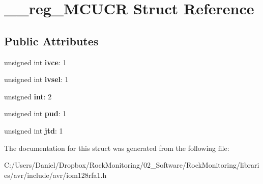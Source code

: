 \hypertarget{struct____reg___m_c_u_c_r}{}\section{\+\_\+\+\_\+reg\+\_\+\+M\+C\+U\+CR Struct Reference}
\label{struct____reg___m_c_u_c_r}
\subsection*{Public Attributes}
\begin{DoxyCompactItemize}
\item 
unsigned int {\bfseries ivce}\+: 1\hypertarget{struct____reg___m_c_u_c_r_a3bcdedf7d673406a14f68a2a5ac43a3f}{}\label{struct____reg___m_c_u_c_r_a3bcdedf7d673406a14f68a2a5ac43a3f}

\item 
unsigned int {\bfseries ivsel}\+: 1\hypertarget{struct____reg___m_c_u_c_r_ab6ba72c07957acc703f0e887277ac563}{}\label{struct____reg___m_c_u_c_r_ab6ba72c07957acc703f0e887277ac563}

\item 
unsigned {\bfseries int}\+: 2\hypertarget{struct____reg___m_c_u_c_r_ae5c3ca2b668922d54541b2b3dafc0f65}{}\label{struct____reg___m_c_u_c_r_ae5c3ca2b668922d54541b2b3dafc0f65}

\item 
unsigned int {\bfseries pud}\+: 1\hypertarget{struct____reg___m_c_u_c_r_a44f01c4a9c724c48301011e10e2c3314}{}\label{struct____reg___m_c_u_c_r_a44f01c4a9c724c48301011e10e2c3314}

\item 
unsigned int {\bfseries jtd}\+: 1\hypertarget{struct____reg___m_c_u_c_r_a96265fd906c29283314a808a9d03589d}{}\label{struct____reg___m_c_u_c_r_a96265fd906c29283314a808a9d03589d}

\end{DoxyCompactItemize}


The documentation for this struct was generated from the following file\+:\begin{DoxyCompactItemize}
\item 
C\+:/\+Users/\+Daniel/\+Dropbox/\+Rock\+Monitoring/02\+\_\+\+Software/\+Rock\+Monitoring/libraries/avr/include/avr/iom128rfa1.\+h\end{DoxyCompactItemize}
